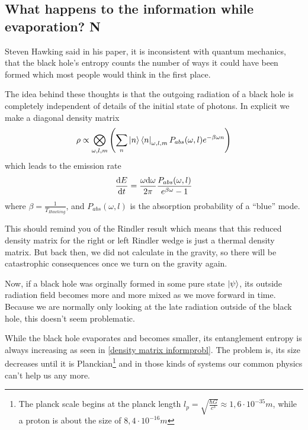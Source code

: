 \subsection{What happens to the information while evaporation? N}
	Steven Hawking said in his paper\marginpar{[2]}, it is inconsistent with quantum mechanics, that the black hole's entropy counts the number of ways it could have been formed which most people would think in the first place. 
	
	The idea behind these thoughts is that the outgoing radiation of a black hole is completely independent of details of the initial state of photons. 
	In explicit we make a diagonal density matrix
		\begin{equation} \label{density matrix informprobl}
			\rho \propto \bigotimes_{\omega, l, m} \left(
			\sum_n \ket{n} \bra{n}_{\omega, l, m} P_{abs} (\omega, l) e^{-\beta \omega n}
			\right)
		\end{equation}
	which leads to the emission rate 
		\begin{equation}
			\frac{\mathrm{d} E}{\mathrm{d} t} = 
			\frac{\omega \mathrm{d} \omega}{2\pi} 
			\frac{P_{abs}(\omega, l)}{e^{\beta \omega}-1}
		\end{equation}
	where $\beta = \frac{1}{T_{Hawking}}$, and $P_{abs}(\omega, l)$ is the absorption
	probability of a ``blue'' mode.
		
	This should remind you of the Rindler result which means that this reduced density matrix for the right or left Rindler wedge is just a thermal density matrix. But back then, we did not calculate in the gravity, so there will be catastrophic consequences once we turn on the gravity again.
		
	Now, if a black hole was orginally formed in some pure state $\ket{\psi}$, its outside radiation field becomes more and more mixed as we move forward in time. Because we are normally only looking at the late radiation outside of the black hole, this doesn't seem problematic. 
		
	While the black hole evaporates and becomes smaller, its entanglement entropy is always increasing as seen in \eqref{density matrix informprobl}. The problem is, its size decreases until it is Planckian\footnote{The planck scale begins at the planck length $l_p = \sqrt{\frac{\hbar G}{c^3}} \approx 1,6 \cdot 10^{-35}\unit{m}$, while a proton is about the size of $8,4 \cdot 10^{-16}\unit{m}$} and in those kinds of systems our common physics can't help us any more.
	

